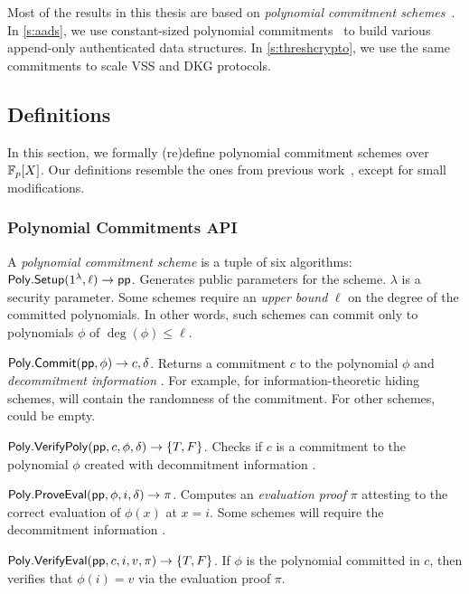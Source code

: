Most of the results in this thesis are based on \textit{polynomial commitment schemes}~\cite{Feldman87,Pedersen1991NonInteractive,KZG10a,BFS19,ZXZS19}.
In \cref{s:aads}, we use constant-sized polynomial commitments~\cite{KZG10a} to build various append-only authenticated data structures.
In \cref{s:threshcrypto}, we use the same commitments to scale VSS and DKG protocols.

\subsection{Definitions}
In this section, we formally (re)define polynomial commitment schemes over $\mathbb{F}_p[X]$.
Our definitions resemble the ones from previous work~\cite{KZG10a}, except for small modifications.

\subsubsection{Polynomial Commitments API}
\label{s:prelim:polycommit:api}
A \textit{polynomial commitment scheme} is a tuple of six algorithms:
\\

\api $\mathsf{Poly.Setup}(1^\lambda, \ell)\rightarrow \mathsf{pp}$.
Generates public parameters \pp for the scheme.
$\lambda$ is a security parameter.
Some schemes require an \textit{upper bound} $\ell$ on the degree of the committed polynomials.
In other words, such schemes can commit only to polynomials $\phi$ of $\deg(\phi)\le \ell$.

\api $\mathsf{Poly.Commit}(\mathsf{pp}, \phi)\rightarrow c, \delta$.
Returns a commitment $c$ to the polynomial $\phi$ and \textit{decommitment information} \decominfo.
For example, for information-theoretic hiding schemes, \decominfo will contain the randomness of the commitment.
For other schemes, \decominfo could be empty.

\api $\mathsf{Poly.VerifyPoly}(\mathsf{pp}, c, \phi, \delta)\rightarrow \{T,F\}$.
Checks if $c$ is a commitment to the polynomial $\phi$ created with decommitment information \decominfo.

\api $\mathsf{Poly.ProveEval}(\mathsf{pp}, \phi, i, \delta)\rightarrow \pi$.
Computes an \textit{evaluation proof} $\pi$ attesting to the correct evaluation of $\phi(x)$ at $x=i$.
Some schemes will require the decommitment information \decominfo.

\api $\mathsf{Poly.VerifyEval{}}(\mathsf{pp}, c, i, v, \pi)\rightarrow \{T,F\}$.
If $\phi$ is the polynomial committed in $c$, then verifies that $\phi(i)=v$ via the evaluation proof $\pi$.

